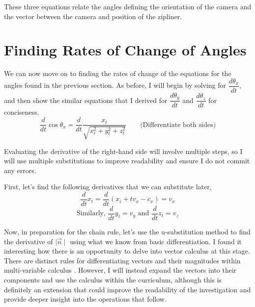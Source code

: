\documentclass[12pt]{article}
\begin{document}
These three equations relate the angles defining the orientation of the camera and the vector between the camera and position of the zipliner.


\section{Finding Rates of Change of Angles}

We can now move on to finding the rates of change of the equations for the angles found in the previous section. As before, I will begin by solving for $\dfrac{d\theta_x}{dt}$, and then show the similar equations that I derived for $\dfrac{d\theta_y}{dt}$ and $\dfrac{d\theta_z}{dt}$ for conciseness.
$$\frac{d}{dt}\cos \theta_x = \frac{d}{dt} \frac{x_t}{\sqrt{x_t^2+y_t^2+z_t^2}} \quad \quad \text{(Differentiate both sides)}$$

Evaluating the derivative of the right-hand side will involve multiple steps, so I will use multiple substitutions to improve readability and ensure I do not commit any errors.

First, let's find the following derivatives that we can substitute later, 
$$\frac{d}{dt} x_t = \frac{d}{dt} (x_i + tv_x - c_x) = v_x$$
$$\text{Similarly, }\frac{d}{dt} y_t = v_y \text{ and }\frac{d}{dt} z_t = v_z$$

Now, in preparation for the chain rule, let's use the u-substitution method to find the derivative of $\mid \vec n \mid$ using what we know from basic differentiation. I found it interesting how there is an opportunity to delve into vector calculus at this stage. There are distinct rules for differentiating vectors and their magnitudes within multi-variable calculus \autocite{multivar}. However, I will instead expand the vectors into their components and use the calculus within the curriculum, although this is definitely an extension that could improve the readability of the investigation and provide deeper insight into the operations that follow. 

\end{document}
